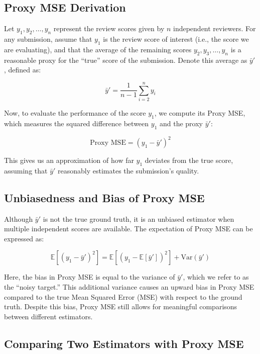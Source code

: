 \documentclass{article} %
\begin{document}
\subsection{Proxy MSE Derivation}

Let $y_1, y_2, \ldots, y_n$ represent the review scores given by $n$ independent reviewers. For any submission, assume that $y_1$ is the review score of interest (i.e., the score we are evaluating), and that the average of the remaining scores $y_2, y_3, \ldots, y_n$ is a reasonable proxy for the ``true'' score of the submission. Denote this average as $\bar{y}'$, defined as:

\begin{equation}
    \bar{y}' = \frac{1}{n-1} \sum_{i=2}^{n} y_i
\end{equation}

Now, to evaluate the performance of the score $y_1$, we compute its Proxy MSE, which measures the squared difference between $y_1$ and the proxy $\bar{y}'$:

\begin{equation}
    \text{Proxy MSE} = (y_1 - \bar{y}')^2
\end{equation}

This gives us an approximation of how far $y_1$ deviates from the true score, assuming that $\bar{y}'$ reasonably estimates the submission's quality.

\subsection{Unbiasedness and Bias of Proxy MSE}

Although $\bar{y}'$ is not the true ground truth, it is an unbiased estimator when multiple independent scores are available. The expectation of Proxy MSE can be expressed as:

\begin{equation}
    \mathbb{E}[(y_1 - \bar{y}')^2] = \mathbb{E}[(y_1 - \mathbb{E}[\bar{y}'])^2] + \text{Var}(\bar{y}')
\end{equation}

Here, the bias in Proxy MSE is equal to the variance of $\bar{y}'$, which we refer to as the ``noisy target.'' This additional variance causes an upward bias in Proxy MSE compared to the true Mean Squared Error (MSE) with respect to the ground truth. Despite this bias, Proxy MSE still allows for meaningful comparisons between different estimators.

\subsection{Comparing Two Estimators with Proxy MSE}
\end{document}
